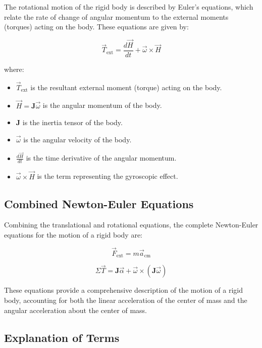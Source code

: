 The rotational motion of the rigid body is described by Euler's equations, which relate the rate of change of angular momentum to the external moments (torques) acting on the body. These equations are given by:

\[
\vec{T}_{\text{ext}} = \frac{d \vec{H}}{dt} + \vec{\omega} \times \vec{H}
\]

where:
\begin{itemize}
    \item \( \vec{T}_{\text{ext}} \) is the resultant external moment (torque) acting on the body.
    \item \( \vec{H} = \mathbf{J} \vec{\omega} \) is the angular momentum of the body.
    \item \( \mathbf{J} \) is the inertia tensor of the body.
    \item \( \vec{\omega} \) is the angular velocity of the body.
    \item \( \frac{d \vec{H}}{dt} \) is the time derivative of the angular momentum.
    \item \( \vec{\omega} \times \vec{H} \) is the term representing the gyroscopic effect.
\end{itemize}

\subsection{Combined Newton-Euler Equations}

Combining the translational and rotational equations, the complete Newton-Euler equations for the motion of a rigid body are:

\[
\vec{F}_{\text{ext}} = m \vec{a}_{\text{cm}}
\]

\begin{equation}
\Sigma\vec{T} = \mathbf{J} \vec{\alpha} + \vec{\omega} \times (\mathbf{J} \vec{\omega})
\end{equation}

These equations provide a comprehensive description of the motion of a rigid body, accounting for both the linear acceleration of the center of mass and the angular acceleration about the center of mass. 
\subsection{Explanation of Terms}

